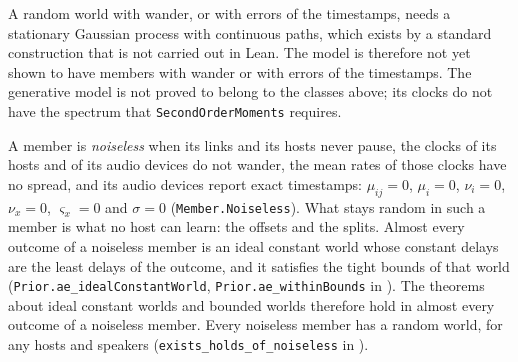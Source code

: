 \documentclass[11pt,a4paper]{article}
\newcommand{\lean}[1]{\texttt{#1}}
\theoremstyle{definition}
\begin{document}
A random world with wander, or with errors of the timestamps, needs a
stationary Gaussian process with continuous paths, which exists by a
standard construction that is not carried out in Lean. The model is therefore
not yet shown to have members with wander or with errors of the timestamps.
The generative model is not proved to belong to the classes above;
its clocks do not have the spectrum that \lean{SecondOrderMoments} requires.

A member is \emph{noiseless} when its links and its hosts never pause, the
clocks of its hosts and of its audio devices do not wander, the mean rates
of those clocks have no spread, and its audio devices report exact
timestamps: $\mu_{ij} = 0$, $\mu_i = 0$, $\nu_i = 0$, $\nu_x = 0$,
$\varsigma_x = 0$ and $\sigma = 0$
(\lean{Member.Noiseless}). What stays random in such a member is what no
host can learn: the offsets and the splits. Almost every outcome of a
noiseless member is an ideal constant world whose constant delays are the
least delays of the outcome, and it satisfies the tight bounds of that world
(\lean{Prior.ae\_idealConstantWorld}, \lean{Prior.ae\_withinBounds} in
). The theorems about
ideal constant worlds and bounded worlds therefore hold in almost every
outcome of a noiseless member.
Every noiseless member has a random world, for any hosts and speakers
(\lean{exists\_holds\_of\_noiseless} in
).
\end{document}

